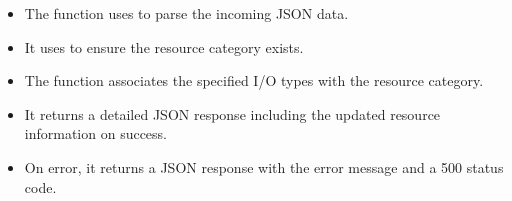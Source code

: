 \documentclass[letterpaper,10pt,english]{sphinxmanual}
\begin{document}
\begin{fulllineitems}
\begin{description}
\begin{itemize}
\item {} 
\sphinxAtStartPar
The function uses  to parse the incoming JSON data.

\item {} 
\sphinxAtStartPar
It uses  to ensure the resource category exists.

\item {} 
\sphinxAtStartPar
The function associates the specified I/O types with the resource category.

\item {} 
\sphinxAtStartPar
It returns a detailed JSON response including the updated resource information on success.

\item {} 
\sphinxAtStartPar
On error, it returns a JSON response with the error message and a 500 status code.

\end{itemize}

\end{description}

\end{fulllineitems}

\end{document}
